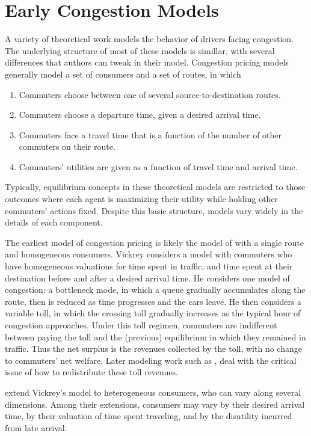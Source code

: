 \documentclass[JEL]{AEA}
\begin{document}
\section{Early Congestion Models}
\label{early-congestion-models}

A variety of theoretical work models the behavior of drivers facing congestion. The underlying structure of most of these models is simillar, with several differences that authors can tweak in their model. Congestion pricing models generally model a set of consumers and a set of routes, in which 

\begin{enumerate}
    \item Commuters choose between one of several source-to-destination routes.
    \item Commuters choose a departure time, given a desired arrival time.
    \item Commuters face a travel time that is a function of the number of other commuters on their route.
    \item Commuters' utilities are given as a function of travel time and arrival time.
\end{enumerate}

Typically, equilibrium concepts in these theoretical models are restricted to those outcomes where each agent is maximizing their utility while holding other commuters' actions fixed. Despite this basic structure, models vary widely in the details of each component. 

The earliest model of congestion pricing is likely the model of \cite{vickrey-1969} with a single route and homogeneous consumers. Vickrey considers a model with commuters who have homogeneous valuations for time spent in traffic, and time spent at their destination before and after a desired arrival time. He considers one model of congestion: a bottleneck mode, in which a queue gradually accumulates along the route, then is reduced as time progresses and the cars leave. He then considers a variable toll, in which the crossing toll gradually increases as the typical hour of congestion approaches. Under this toll regimen, commuters are indifferent between paying the toll and the (previous) equilibrium in which they remained in traffic. Thus the net surplus is the revenues collected by the toll, with no change to commuters' net welfare. Later modeling work such as \cite{eliasson-2006}, deal with the critical issue of how to redistribute these toll revenues.

\cite{arnott-1994} extend Vickrey's model to heterogeneous consumers, who can vary along several dimensions. Among their extensions, consumers may vary by their desired arrival time, by their valuation of time spent traveling, and by the disutility incurred from late arrival.
\end{document}
